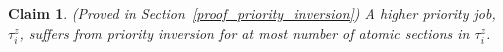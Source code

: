 \documentclass[conference]{sig-alternate}
\newtheorem{clm}{Claim}
\begin{document}
\begin{clm}
\label{priority_inversion}
(Proved in Section~\ref{proof_priority_inversion}) A higher priority job, $\tau_i^z$, suffers from priority inversion for at most number of atomic sections in $\tau_i^z$.
\end{clm}

\end{document}
